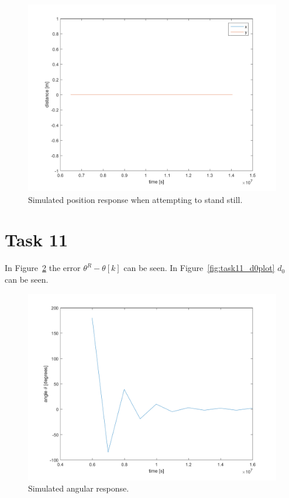 \documentclass[a4paper,12pt,oneside,onecolumn]{article} %
\begin{document}
    \begin{figure}[H]
        \centering
        \includegraphics[scale = 0.5]{../matlab/images/task10_stillplot.png}
        \caption{Simulated position response when attempting to stand still.}
        \label{fig:task10_stillplot}
    \end{figure}

\section*{Task 11}
In Figure~\ref{fig:task11_angleplot} the error $\theta^R - \theta[k]$ can be seen. In Figure~\ref{fig:task11_d0plot} $d_0$ can be seen.

\begin{figure}[H]
        \centering
        \includegraphics[scale = 0.5]{../matlab/images/task11_angleplot.png}
        \caption{Simulated angular response.}
        \label{fig:task11_angleplot}
    \end{figure}
    
\end{document}
